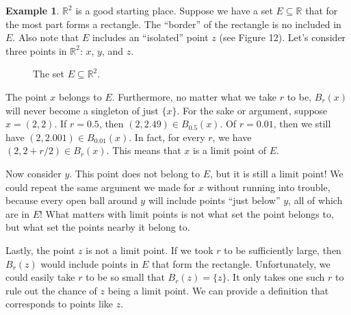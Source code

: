 \documentclass{article}
\newcommand{\R}{\mathbb{R}}
\theoremstyle{definition}
\newtheorem{example}{Example}[section]
\begin{document}
	\begin{example}
		$\R^2$ is a good starting place. Suppose we have a set $ E\subseteq \R $ that for the most part forms a rectangle. The ``border'' of the rectangle is no included in $ E $. Also note that $ E $ includes an ``isolated'' point $ z $ (see Figure 12). Let's consider three points in $ \R^2 $: $ x $, $ y $, and $ z $.  
		\begin{figure}[h]
			\centering
			\caption{The set $ E\subseteq \R^2 $.}
		\end{figure}
		
		The point $ x $ belongs to $ E $. Furthermore, no matter what we take $ r $ to be, $ B_r(x) $ will never become a singleton of just $ \{x\} $. For the sake or argument, suppose $ x=(2,2) $. If $ r=0.5 $, then $ (2,2.49)\in B_{0.5}(x) $. Of $ r=0.01 $, then we still have $ (2,2.001)\in B_{0.01}(x) $. In fact, for every $ r $, we have $ (2,2+r/2)\in B_r(x) $. This means that $ x $ is a limit point of $ E $. 
		
		Now consider $ y $. This point does not belong to $ E $, but it is still a limit point! We could repeat the same argument we made for $ x $ without running into trouble, because every open ball around $ y $ will include points ``just below'' $ y $, all of which are in $ E $! What matters with limit points is not what set the point belongs to, but what set the points nearby it belong to. 
		
		Lastly, the point $ z $ is not a limit point. If we took $ r $ to be sufficiently large, then $ B_r(z) $ would include points in $ E $ that form the rectangle. Unfortunately, we could easily take $ r$ to be so small that $ B_r(z)=\{z\} $. It only takes one such $ r $ to rule out the chance of $ z $ being a limit point. We can provide a definition that corresponds to points like $ z $.     
	\end{example}
	
\end{document}

